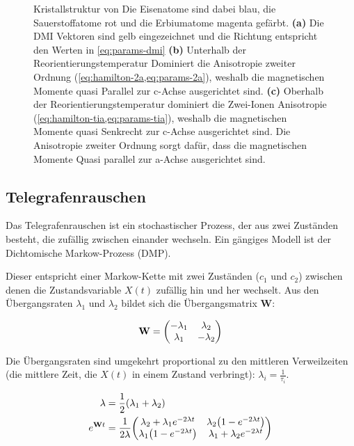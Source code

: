 \documentclass[main.tex]{subfiles}
\begin{document}
\begin{figure}[htbp]
	\caption{Kristallstruktur von   Die Eisenatome sind dabei blau, die Sauerstoffatome rot und die Erbiumatome magenta gefärbt.
	\textbf{(a)} Die DMI Vektoren sind gelb eingezeichnet und die Richtung entspricht den Werten in \cref{eq:params-dmi} 
	\textbf{(b)} Unterhalb der Reorientierungstemperatur Dominiert die Anisotropie zweiter Ordnung (\cref{eq:hamilton-2a,eq:params-2a}), weshalb die magnetischen Momente quasi Parallel zur c-Achse ausgerichtet sind.
	\textbf{(c)} Oberhalb der Reorientierungstemperatur dominiert die Zwei-Ionen Anisotropie (\cref{eq:hamilton-tia,eq:params-tia}), weshalb die magnetischen Momente quasi Senkrecht zur c-Achse ausgerichtet sind. Die Anisotropie zweiter Ordnung sorgt dafür, dass die magnetischen Momente Quasi parallel zur a-Achse ausgerichtet sind.\cite{schlegel-master}}
	\label{fig:orthoferrit}
\end{figure}

\subsection{Telegrafenrauschen}

Das Telegrafenrauschen ist ein stochastischer Prozess, der aus zwei Zuständen besteht, die zufällig zwischen einander wechseln. Ein gängiges Modell ist der Dichtomische Markow-Prozess (DMP).

Dieser entspricht einer Markow-Kette mit zwei Zuständen (\(c_1\) und \(c_2\))
zwischen denen die Zustandsvariable \(X(t)\) zufällig hin und her wechselt. Aus
den Übergangsraten \(\lambda_1\) und \(\lambda_2\) bildet sich die
Übergangsmatrix \(\mathbf{W}\):

\begin{align}
	\mathbf{W} = \mqty(
	-\lambda_1 & \lambda_2   \\
	\lambda_1  & -\lambda_2)
\end{align}

Die Übergangsraten sind umgekehrt proportional zu den mittleren Verweilzeiten
(die mittlere Zeit, die \(X(t)\) in einem Zustand verbringt): \(\lambda_i =
\frac{1}{\tau_i}\).

\begin{align}
	\lambda &= \frac{1}{2} \qty(\lambda_1 + \lambda_2)\\
	e^{\mathbf{W}t} &= \frac{1}{2\lambda} \mqty(\lambda_2 + \lambda_1 e^{-2\lambda t} & \lambda_2 \qty(1- e^{-2\lambda t})\\
	\lambda_1 \qty(1- e^{-2\lambda t}) & \lambda_1 + \lambda_2 e^{-2\lambda t})
\end{align}
\end{document}
